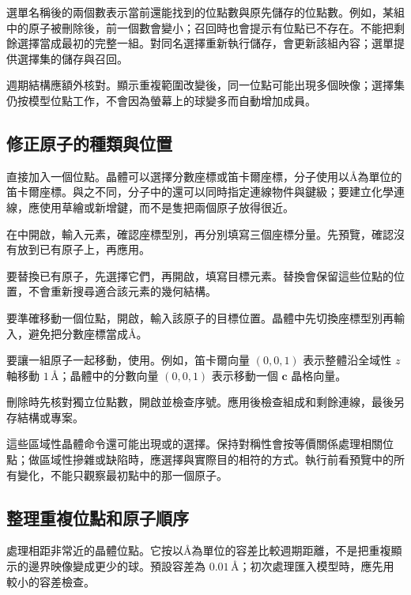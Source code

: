 選單名稱後的兩個數表示當前還能找到的位點數與原先儲存的位點數。例如，某組中的原子被刪除後，前一個數會變小；召回時也會提示有位點已不存在。不能把剩餘選擇當成最初的完整一組。對同名選擇重新執行儲存，會更新該組內容；選單提供選擇集的儲存與召回。

週期結構應額外核對。顯示重複範圍改變後，同一位點可能出現多個映像；選擇集仍按模型位點工作，不會因為螢幕上的球變多而自動增加成員。

\subsection{修正原子的種類與位置}\label{sec:atom-edit-reference}

直接加入一個位點。晶體可以選擇分數座標或笛卡爾座標，分子使用以\AA 為單位的笛卡爾座標。與之不同，分子中的還可以同時指定連線物件與鍵級；要建立化學連線，應使用草繪或新增鍵，而不是隻把兩個原子放得很近。

\begin{steps}
  \item 在中開啟，輸入元素，確認座標型別，再分別填寫三個座標分量。先預覽，確認沒有放到已有原子上，再應用。
  \item 要替換已有原子，先選擇它們，再開啟，填寫目標元素。替換會保留這些位點的位置，不會重新搜尋適合該元素的幾何結構。
  \item 要準確移動一個位點，開啟，輸入該原子的目標位置。晶體中先切換座標型別再輸入，避免把分數座標當成\AA。
  \item 要讓一組原子一起移動，使用。例如，笛卡爾向量 \((0,0,1)\) 表示整體沿全域性 $z$ 軸移動 $1\,\text{\AA}$；晶體中的分數向量 \((0,0,1)\) 表示移動一個 $\mathbf c$ 晶格向量。
  \item 刪除時先核對獨立位點數，開啟並檢查序號。應用後檢查組成和剩餘連線，最後另存結構或專案。
\end{steps}

這些區域性晶體命令還可能出現或的選擇。保持對稱性會按等價關係處理相關位點；做區域性摻雜或缺陷時，應選擇與實際目的相符的方式。執行前看預覽中的所有變化，不能只觀察最初點中的那一個原子。

\subsection{整理重複位點和原子順序}\label{sec:atom-clean-reference}

處理相距非常近的晶體位點。它按以\AA 為單位的容差比較週期距離，不是把重複顯示的邊界映像變成更少的球。預設容差為 $0.01\,\text{\AA}$；初次處理匯入模型時，應先用較小的容差檢查。

